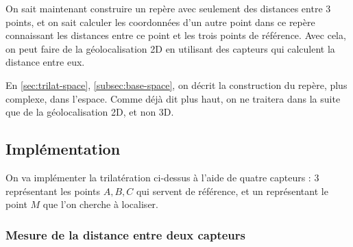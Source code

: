 \documentclass[french, a4paper, 12pt, parskip]{scrartcl}
\begin{document}
On sait maintenant construire un repère avec seulement des distances entre 3
points, et on sait calculer les coordonnées d'un autre point dans ce repère
connaissant les distances entre ce point et les trois points de référence. Avec
cela, on peut faire de la géolocalisation 2D en utilisant des capteurs qui
calculent la distance entre eux.

En \autoref{sec:trilat-space}, \autoref{subsec:base-space}, on décrit la
construction du repère, plus complexe, dans l'espace. Comme déjà dit plus haut,
on ne traitera dans la suite que de la géolocalisation 2D, et non 3D.

\subsection{Implémentation}

On va implémenter la trilatération ci-dessus à l'aide de quatre capteurs : 3
représentant les points $A, B, C$ qui servent de référence, et un représentant
le point $M$ que l'on cherche à localiser.

\subsubsection{Mesure de la distance entre deux capteurs}
\end{document}

